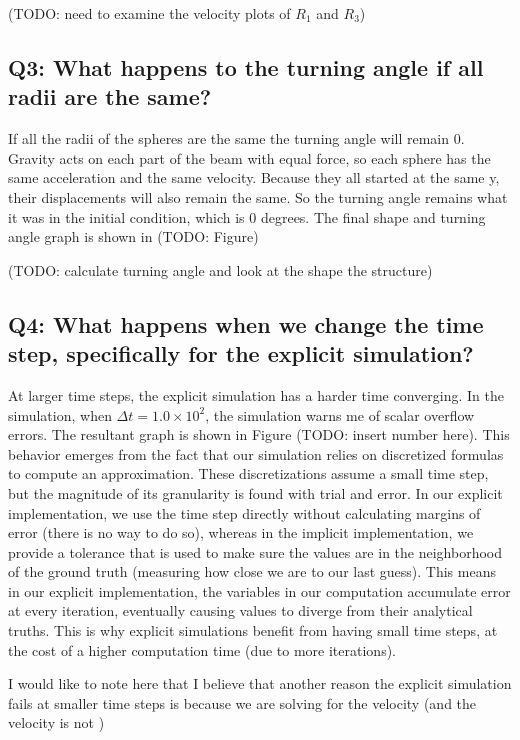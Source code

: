 \documentclass[letterpaper, 10 pt, conference]{ieeeconf}  %
\begin{document}
(TODO: need to examine the velocity plots of $R_1$ and $R_3$)

\subsection{ Q3: What happens to the turning angle if all radii are the same? }

If all the radii of the spheres are the same the turning angle will remain 0. Gravity acts on each part of the beam with equal force, so each sphere has the same acceleration and the same velocity. Because they all started at the same y, their displacements will also remain the same. So the turning angle remains what it was in the initial condition, which is 0 degrees. The final shape and turning angle graph is shown in (TODO: Figure)

(TODO: calculate turning angle and look at the shape the structure)

\subsection{ Q4: What happens when we change the time step, specifically for the explicit simulation?}
At larger time steps, the explicit simulation has a harder time converging. In the simulation, when $\Delta t = 1.0 \times  10^2$, the simulation warns me of scalar overflow errors. The resultant graph is shown in Figure (TODO: insert number here). This behavior emerges from the fact that our simulation relies on discretized formulas to compute an approximation. These discretizations assume a small time step, but the magnitude of its granularity is found with trial and error. In our explicit implementation, we use the time step directly without calculating margins of error (there is no way to do so), whereas in the implicit implementation, we provide a tolerance that is used to make sure the values are in the neighborhood of the ground truth (measuring how close we are to our last guess). This means in our explicit implementation, the variables in our computation accumulate error at every iteration, eventually causing values to diverge from their analytical truths. This is why explicit simulations benefit from having small time steps, at the cost of a higher computation time (due to more iterations).

I would like to note here that I believe that another reason the explicit simulation fails at smaller time steps is because we are solving for the velocity (and the velocity is not )
\end{document}
